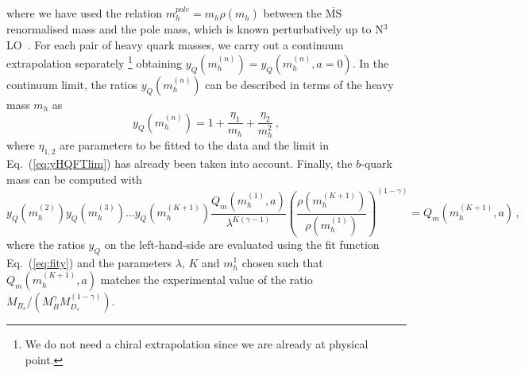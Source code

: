 where we have used the relation  $ m^{pole}_h= m_{h}^{} \rho( m_{h}^{})$
between the $\overline{\mbox{MS}}$ renormalised mass and the pole
mass, which is known perturbatively up to N$^3$LO~\cite{Chetyrkin:1999pq}.
For each pair of heavy quark masses, we carry out a continuum
extrapolation separately
\footnote{We do not need a chiral extrapolation since we are already at physical point.}
obtaining $y_Q( m^{(n)}_h)=y_Q( m^{(n)}_h,a=0)$.
In the continuum limit, the ratios $y_Q( m^{(n)}_h)$ can be described
in terms of the heavy mass $m_h$ as~\cite{ETM:2011zey}
\begin{equation}
  y_Q( m^{(n)}_h) = 1 + \frac{\eta_1}{ m_h}+ \frac{\eta_2}{ m_h^2}\,,
  \label{eq:fity}
\end{equation}
where $\eta_{1,2}$ are parameters to be fitted to the data and the limit in
Eq.~(\ref{eq:yHQFTlim}) has already been taken into account.
Finally, the $b$-quark mass can be computed with
\begin{equation}
  y_Q( m^{(2)}_h)y_Q( m^{(3)}_h)...y_Q( m^{(K+1)}_h)\frac{Q_m( m_h^{(1)},a)}{\lambda^{K(\gamma-1)}}
  \left(\frac{ \rho( m_{h}^{(K+1)})}{\rho( m_{h}^{(1)})}\right)^{(1-\gamma)}=Q_m( m_h^{(K+1)},a)
  \,,
\end{equation}
where the ratios $y_Q$ on the left-hand-side are evaluated using the
fit function Eq.~(\ref{eq:fity}) and the parameters $\lambda$, $K$ and
$ m_h^1$ chosen such that $Q_m( m_h^{(K+1)},a)$ matches 
the experimental value of the ratio $M_{B_s}/(M_{B}^\gamma M_{D_s}^{(1-\gamma)})$.


\endinput
